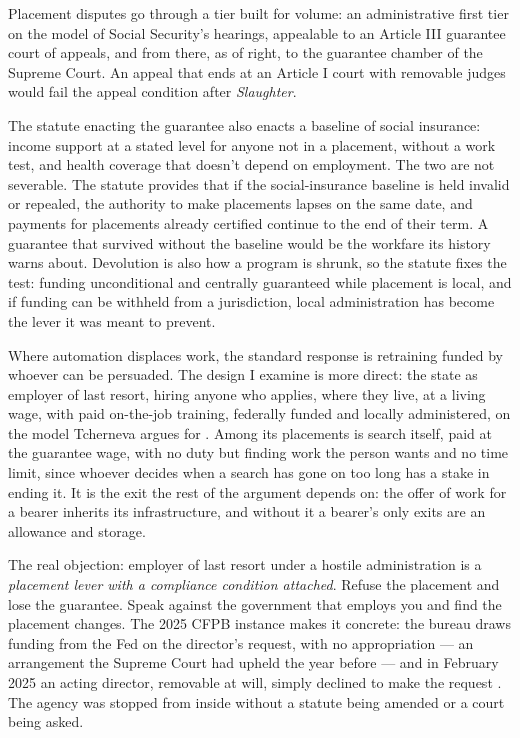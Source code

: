 Placement disputes go through a tier built for volume: an administrative first tier on the model of Social Security's hearings, appealable to an Article III guarantee court of appeals, and from there, as of right, to the guarantee chamber of the Supreme Court. An appeal that ends at an Article I court with removable judges would fail the appeal condition after \emph{Slaughter}.

The statute enacting the guarantee also enacts a baseline of social insurance: income support at a stated level for anyone not in a placement, without a work test, and health coverage that doesn't depend on employment. The two are not severable. The statute provides that if the social-insurance baseline is held invalid or repealed, the authority to make placements lapses on the same date, and payments for placements already certified continue to the end of their term. A guarantee that survived without the baseline would be the workfare its history warns about. Devolution is also how a program is shrunk, so the statute fixes the test: funding unconditional and centrally guaranteed while placement is local, and if funding can be withheld from a jurisdiction, local administration has become the lever it was meant to prevent.


Where automation displaces work, the standard response is retraining funded by whoever can be persuaded. The design I examine is more direct: the state as employer of last resort, hiring anyone who applies, where they live, at a living wage, with paid on-the-job training, federally funded and locally administered, on the model Tcherneva argues for \autocite{tcherneva2020case}. Among its placements is search itself, paid at the guarantee wage, with no duty but finding work the person wants and no time limit, since whoever decides when a search has gone on too long has a stake in ending it. It is the exit the rest of the argument depends on: the offer of work for a bearer inherits its infrastructure, and without it a bearer's only exits are an allowance and storage.

The real objection: employer of last resort under a hostile administration is a \emph{placement lever with a compliance condition attached}. Refuse the placement and lose the guarantee. Speak against the government that employs you and find the placement changes. The 2025 CFPB instance makes it concrete: the bureau draws funding from the Fed on the director's request, with no appropriation — an arrangement the Supreme Court had upheld the year before \autocite{cfpb2024cfsa} — and in February 2025 an acting director, removable at will, simply declined to make the request \autocite{kolodziej2025cfpb}. The agency was stopped from inside without a statute being amended or a court being asked.


